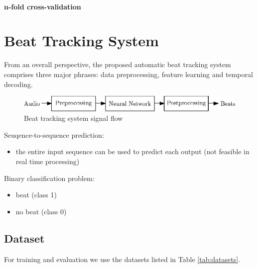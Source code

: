 \documentclass{scrartcl}
\begin{document}
\paragraph{n-fold cross-validation} 




\newpage
\section{Beat Tracking System}

From an overall perspective, the proposed automatic beat tracking system comprises three major phrases: data preprocessing, feature learning and temporal decoding. 

\begin{figure}[htbp]
\centering
\includegraphics[scale=1.0]{figures/beat_tracking_system.eps}
\caption{Beat tracking system signal flow}
\label{fig:}
\end{figure}  


Seuqence-to-sequence prediction:
\begin{itemize}
\item the entire input sequence can be used to predict each output (not feasible in real time processing)
\end{itemize}

Binary classification problem:
\begin{itemize}
\item beat (class 1)
\item no beat (class 0)
\end{itemize}



\subsection{Dataset}
For training and evaluation we use the datasets listed in Table \ref{tab:datasets}.
\end{document}
